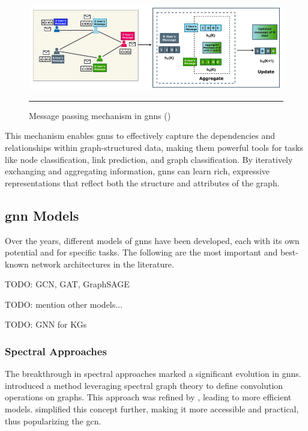 \begin{figure}[htbp]
    \centering
 \includegraphics[width=.9\textwidth]{03_Figures/literature-review/gnn-message-passing-mechanism.png}
     \rule{35em}{0.5pt}
    \caption{Message passing mechanism in \glspl{gnn} (\cite{Khemani2024})} 
 \label{fig:gnn-message-passing-mechanism}
\end{figure}

This mechanism enables \glspl{gnn} to effectively capture the dependencies and relationships within graph-structured data, making them powerful tools for tasks like node classification, link prediction, and graph classification.
By iteratively exchanging and aggregating information, \glspl{gnn} can learn rich, expressive representations that reflect both the structure and attributes of the graph.

\subsection*{\gls{gnn} Models}
Over the years, different models of \glspl{gnn} have been developed, each with its own potential and for specific tasks.
The following are the most important and best-known network architectures in the literature.

TODO: GCN, GAT, GraphSAGE

TODO: mention other models...

TODO: GNN for KGs

\subsubsection*{Spectral Approaches}

The breakthrough in spectral approaches marked a significant evolution in \glspl{gnn}. \cite{Bruna2013} introduced a method leveraging spectral graph theory to define convolution operations on graphs. This approach was refined by \cite{Defferrard2016}, leading to more efficient models. \cite{Kipf2017} simplified this concept further, making it more accessible and practical, thus popularizing the \gls{gcn}.

